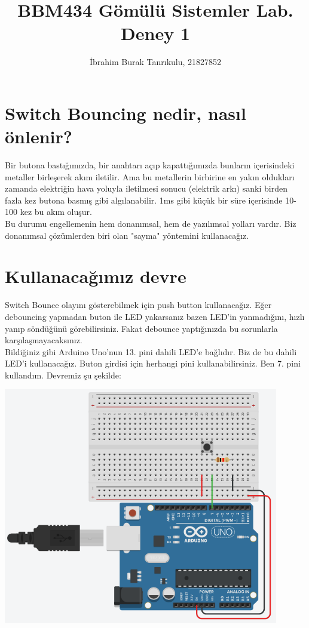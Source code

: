 \documentclass[11pt]{article}
\author{İbrahim Burak Tanrıkulu, 21827852}
\title{BBM434 Gömülü Sistemler Lab.\\Deney 1}
\begin{document}
\maketitle

\section{Switch Bouncing nedir, nasıl önlenir?}
Bir butona bastığımızda, bir anahtarı açıp kapattığımızda bunların içerisindeki metaller birleşerek akım iletilir. Ama bu metallerin birbirine en yakın oldukları zamanda elektriğin hava yoluyla iletilmesi sonucu (elektrik arkı) sanki birden fazla kez butona basmış gibi algılanabilir. 1ms gibi küçük bir süre içerisinde 10-100 kez bu akım oluşur.\\
Bu durumu engellemenin hem donanımsal, hem de yazılımsal yolları vardır. Biz donanımsal çözümlerden biri olan "sayma" yöntemini kullanacağız.

\section{Kullanacağımız devre}
Switch Bounce olayını gösterebilmek için push button kullanacağız. Eğer debouncing yapmadan buton ile LED yakarsanız bazen LED'in yanmadığını, hızlı yanıp söndüğünü görebilirsiniz. Fakat debounce yaptığınızda bu sorunlarla karşılaşmayacaksınız.\\
Bildiğiniz gibi Arduino Uno'nun 13. pini dahili LED'e bağlıdır. Biz de bu dahili LED'i kullanacağız. Buton girdisi için herhangi pini kullanabilirsiniz. Ben 7. pini kullandım. Devremiz şu şekilde:

\begin{minipage}{0.95\textwidth}
\includegraphics[width=12cm]{Debouncing.png}
\centering
\end{minipage}
\end{document}
